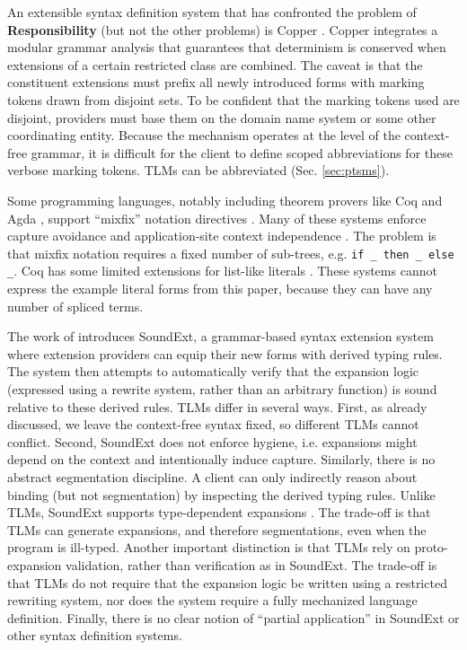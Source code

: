 \documentclass[acmsmall,review,anonymous]{acmart}\settopmatter{printfolios=true,printccs=false,printacmref=false}
\newcommand{\li}[1]{\lstinline[basicstyle=\ttfamily\fontsize{9pt}{1em}\selectfont]{#1}}
\begin{document}
An extensible syntax definition system that has confronted the problem of \textbf{Responsibility} (but not the other problems) is Copper \cite{conf/pldi/SchwerdfegerW09}. Copper integrates a modular grammar analysis that guarantees that determinism is conserved when extensions of a certain restricted class are combined. The caveat is that the constituent extensions must prefix all newly introduced forms with marking tokens drawn from disjoint sets. To be confident that the marking tokens used are disjoint, providers must base them on the domain name system or some other coordinating entity. Because the mechanism operates at the level of the context-free grammar, it is difficult for the client to define scoped abbreviations for these verbose marking tokens. TLMs can be abbreviated (Sec. \ref{sec:ptsms}).

Some programming languages, notably including theorem provers like Coq \cite{Coq:manual} and Agda \cite{norell2007towards}, support ``mixfix'' notation directives \cite{wieland2009parsing,missura1997higher,5134}. Many of these systems enforce capture avoidance and application-site context independence \cite{5134,DBLP:conf/gpce/TahaJ03,Coq:manual,DBLP:conf/ifl/DanielssonN08}. The problem is that mixfix notation requires a fixed number of sub-trees, e.g. \li{if _ then _ else _}. Coq has some limited extensions for list-like literals \cite{Coq:manual}. These systems cannot express the example literal forms from this paper, because they can have any number of spliced terms.


The work of \citet{conf/icfp/LorenzenE13,conf/popl/LorenzenE16} introduces SoundExt, a grammar-based syntax extension system where extension providers can equip their new forms with derived typing rules. The system then attempts to automatically verify that the expansion logic (expressed using a rewrite system, rather than an arbitrary function) is sound relative to these derived rules. TLMs differ in several ways. First, as already discussed, we leave the context-free syntax fixed, so different TLMs cannot conflict. Second, SoundExt does not enforce hygiene, i.e. expansions might depend on the context and intentionally induce capture. Similarly, there is no abstract segmentation discipline. A client can only indirectly reason about binding (but not segmentation) by inspecting the derived typing rules. Unlike TLMs, SoundExt supports type-dependent expansions \cite{conf/popl/LorenzenE16}. The trade-off is that TLMs can generate expansions, and therefore segmentations, even when the program is ill-typed. Another important distinction is that TLMs rely on proto-expansion validation, rather than verification as in SoundExt. The trade-off is that TLMs do not require that the expansion logic be written using a restricted rewriting system, nor does the system require a fully mechanized language definition. Finally, there is no clear notion of ``partial application'' in SoundExt or other syntax definition systems.
\end{document}
